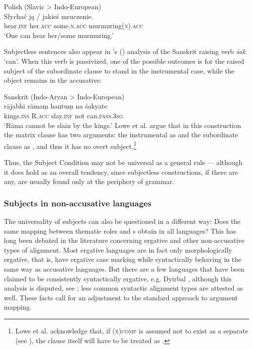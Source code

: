 \documentclass[output=paper]{../langscibook}
\begin{document}
 \ea\label{ex:gfs:nosubj-polish}
 Polish (Slavic > Indo-European)\\
 \gll Słychać {ją /} jakieś mruczenie.\\
 hear.\textsc{inf} her.\textsc{acc} some.\textsc{n.acc} murmuring(\textsc{n}).\textsc{acc}\\
 \glt `One can hear her/some murmuring.'
 \z
 
 Subjectless sentences also appear in \citeauthor{lowe-etal2021}'s (\citeyear{lowe-etal2021}) analysis of the Sanskrit raising verb \textit{śak} `can'. When this verb is passivized, one of the possible outcomes is for the raised subject of the subordinate clause to stand in the instrumental case, while the object remains in the accusative:
 
 \ea
 Sanskrit (Indo-Aryan > Indo-European)\\
 \gll rājabhī rāmaṃ hantuṃ na śakyate\\
 kings.\textsc{ins} R.\textsc{acc} slay.\textsc{inf} not can.\textsc{pass.3sg}\\
 \trans `Rāma cannot be slain by the kings.'
 \z
  Lowe et al. argue that in this construction the matrix clause has two arguments: the instrumental as {\OBLTHETA} and the subordinate clause as \XCOMP, and thus it has no overt subject.\footnote{Lowe et al. acknowledge that, if \textsc{(x)comp} is assumed not to exist as a separate \GF (see ), the clause itself will have to be treated as \SUBJ. }
 
 Thus, the Subject Condition may not be universal as a general rule --- although it does hold as an overall tendency, since subjectless constructions, if there are any, are usually found only at the periphery of grammar.
 
 \subsubsection{Subjects in non-accusative languages\label{sect:gfs:subj-nonacc}}
 
 The universality of subjects can also be questioned in a different way: Does the same mapping between thematic roles and {\GF}s obtain in all languages? This has long been debated in the literature concerning ergative and other non-accusative types of alignment. Most ergative languages are in fact only morphologically ergative, that is, have ergative case marking while syntactically behaving in the same way as accusative languages. But there are a few languages that have been claimed to be consistently syntactically ergative, e.g. Dyirbal \citep{dixon1979}, although this analysis is disputed, see \citet{legate2012}; less common syntactic alignment types are attested as well. These facts call for an adjustment to the standard approach to argument mapping.
 
\end{document}
